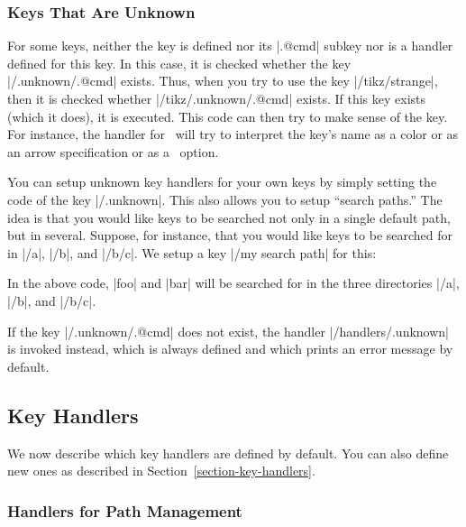 \subsubsection{Keys That Are Unknown}

For some keys, neither the key is defined nor its |.@cmd| subkey nor
is a handler defined for this key. In this case, it is checked whether
the key |/.unknown/.@cmd| exists. Thus, when you try to
use the key |/tikz/strange|, then it is checked whether
|/tikz/.unknown/.@cmd| exists. If this key exists (which it does), it is
executed. This code can then try to make sense of the key. For
instance, the handler for \tikzname\ will try to interpret the key's
name as a color or as an arrow specification or as a \pgfname\
option.

You can setup unknown key handlers for your own keys by simply setting
the code of the key \meta{my path prefix}|/.unknown|. This also allows
you to setup ``search paths.'' The idea is that you would like keys to
be searched not only in a single default path, but in
several. Suppose, for instance, that you would like keys to be
searched 
for in |/a|, |/b|, and |/b/c|. We setup a key |/my search path| for
this:
\begin{codeexample}
\end{codeexample}
In the above code, |foo| and |bar| will be searched for in the three
directories  |/a|, |/b|, and |/b/c|. 

If the key |/.unknown/.@cmd| does not exist, the
handler |/handlers/.unknown| is invoked instead, which is always
defined and which prints an error message by default.

\subsection{Key Handlers}

We now describe which key handlers are defined by default. You can
also define new ones as described in Section~\ref{section-key-handlers}.


\subsubsection{Handlers for Path Management}

